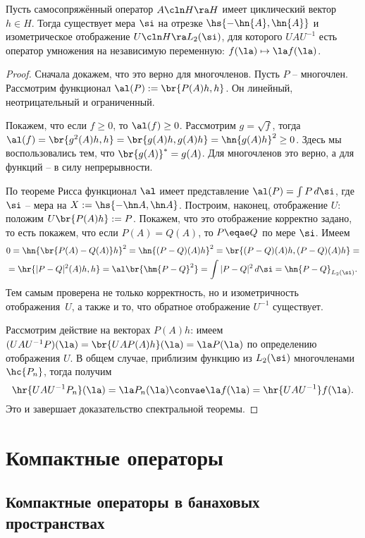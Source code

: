 \documentclass[a4paper]{article}
\begin{document}
\begin{theorem}
Пусть самосопряжённый оператор $A\cln H \ra H$ имеет циклический вектор $h\in H$.
Тогда существует мера $\si$ на отрезке $\hs{-\hn{A}, \hn{A}}$ и изометрическое отображение
$U\cln H \ra L_2(\si)$, для которого
$UAU^{-1}$ есть оператор умножения на независимую переменную: $f(\la) \mapsto \la f(\la)$.
\end{theorem}
\begin{proof}
Сначала докажем, что это верно для многочленов.
Пусть $P$ -- многочлен. Рассмотрим функционал
$\al(P):= \br{P(A)h,h}$. Он линейный, неотрицательный и ограниченный.

Покажем, что если $f \ge 0$, то $\al(f) \ge 0$.
Рассмотрим $g = \sqrt{f}$, тогда $\al(f) = \br{g^2(A)h,h} = \br{g(A)h,g(A)h} = \hn{g(A)h}^2 \ge 0$.
Здесь мы воспользовались тем, что $\br{g(A)}^* = g(A)$. Для многочленов это верно, а для функций -- в силу непрерывности.

По теореме Рисса функционал $\al$ имеет представление $\al(P) = \int P\,d\si$, где
$\si$ -- мера на $X := \hs{-\hn A, \hn A}$. Построим, наконец, отображение $U$: положим
$U\br{P(A)h} := P$.
Покажем, что это отображение корректно задано, то есть покажем, что если $P(A) = Q(A)$, то $P \eqae Q$ по мере $\si$.
Имеем
\begin{multline*}
0 = \hn{\br{P(A)-Q(A)}h}^2 = \hn{(P-Q)(A)h}^2 = \br{(P-Q)(A)h, (P-Q)(A)h} =\\=
\hr{|P-Q|^2(A)h,h} = \al\br{\hm{P-Q}^2}=\int|P-Q|^2\,d\si = \hn{P-Q}_{L_2(\si)}.
\end{multline*}
Тем самым проверена не только корректность, но и изометричность отображения~$U$,
а также и то, что обратное отображение $U^{-1}$ существует.

Рассмотрим действие на векторах $P(A)h$: имеем
$(UAU^{-1} P)(\la) = \br{UAP(A)h}(\la) = \la P(\la)$ по определению отображения $U$.
В общем случае, приблизим функцию из $L_2(\si)$ многочленами $\hc{P_n}$, тогда получим
$$\hr{UAU^{-1}P_n}(\la) = \la P_n(\la) \convae \la f(\la) = \hr{UAU^{-1}}f(\la).$$
Это и завершает доказательство спектральной теоремы.
\end{proof}

\section{Компактные операторы}

\subsection{Компактные операторы в банаховых пространствах}
\end{document}
